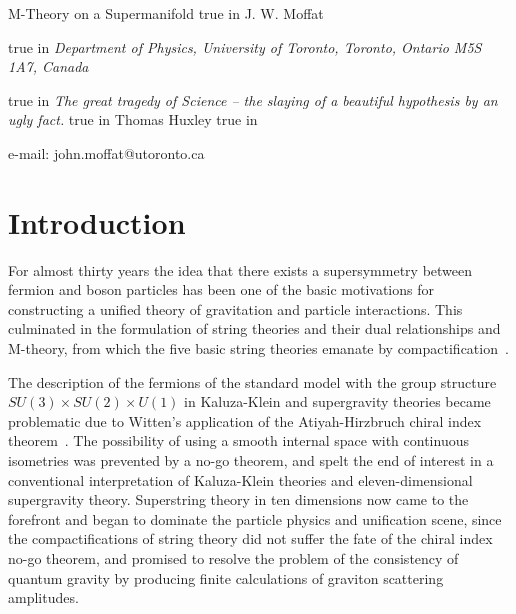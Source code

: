 \documentclass[a4paper,12pt]{article}
\begin{document}
\begin{center}
{\Large M-Theory on a Supermanifold}
 true in
{\large J. W. Moffat}
\date{}
 true in
{\it Department of Physics, University of
Toronto, Toronto, Ontario M5S 1A7, Canada}
\end{center}

\begin{abstract}%
A conjectured finite M-theory based on eleven-dimensional
supergravity formulated in a superspace with a non-anticommutative
$\diamondsuit$-product of field operators is proposed. Supermembranes are
incorporated in the superspace $\diamondsuit$-product formalism. When the deformed
supersymmetry invariant action of eleven-dimensional supergravity theory is expanded
about the standard supersymmetry invariant action, the spontaneously compactified
M-theory can yield a four-dimensional de Sitter spacetime inflationary solution with
dark energy described by the four-form F-fields. A fit to the present
cosmological data for an accelerating universe is obtained from matter
fields describing the dominant dark matter and the four-form F-field dark energy.
Chiral fermions are obtained from the M-theory by allowing singularities in the
compact internal seven-dimensional space. The possibility of obtaining a realistic
M-theory containing the standard model is discussed.
\end{abstract}  
true in {\it The great tragedy of Science -- the slaying of a beautiful hypothesis
by an ugly fact.}   true in Thomas Huxley  true in

e-mail: john.moffat@utoronto.ca

\section{\bf Introduction}

For almost thirty years the idea that there exists a supersymmetry
between fermion and boson particles has been one of the basic motivations
for constructing a unified theory of gravitation and particle interactions.
This culminated in the formulation of string theories and their dual
relationships and M-theory, from which the five basic string theories
emanate by compactification~\cite{Townsend,Polchinski}.

The description of the fermions of the standard model with
the group structure $SU(3)\times SU(2)\times U(1)$ in
Kaluza-Klein and supergravity theories became problematic due to
Witten's application of the Atiyah-Hirzbruch chiral index
theorem~\cite{Atiyah,Witten,Wetterich,Zwiebach,Moffat}. The
possibility of using a smooth internal space with continuous
isometries was prevented by a no-go theorem, and spelt the end
of interest in a conventional interpretation of Kaluza-Klein
theories and eleven-dimensional supergravity theory. Superstring
theory in ten dimensions now came to the forefront and began to
dominate the particle physics and unification scene, since the
compactifications of string theory did not suffer the fate of
the chiral index no-go theorem, and promised to resolve the
problem of the consistency of quantum gravity by producing
finite calculations of graviton scattering amplitudes.
\end{document}
